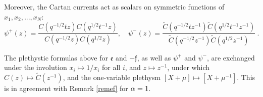 Moreover, the Cartan currents act as scalars on symmetric functions of $x_1,x_2,...,x_N$:
$$
\psi^{+}(z)=\frac{C(q^{-1/2}t z)C(q^{1/2}t^{-1} z)}{C(q^{-1/2} z)C(q^{1/2} z)} , \quad 
\psi^{-}(z)=\frac{{\widetilde C}(q^{-1/2}t z^{-1}){\widetilde C}(q^{1/2}t^{-1} z^{-1})}{{\widetilde C}(q^{-1/2} z^{-1}){\widetilde C}(q^{1/2} z^{-1})}\ .
$$

\begin{remark}
The plethystic formulas above for ${\mathfrak e}$ and $-{\mathfrak f}$, as well as $\psi^+$ and $\psi^-$, 
are exchanged under the involution $x_i\mapsto 1/x_i$
for all $i$, and $z\mapsto z^{-1}$, under which $C(z)\mapsto {\widetilde C}(z^{-1})$, 
and the one-variable plethysm $[X+\mu]\mapsto [X+\mu^{-1}]$. This is in agreement with Remark \ref{remef} for ${\alpha}=1$.
\end{remark}
 
